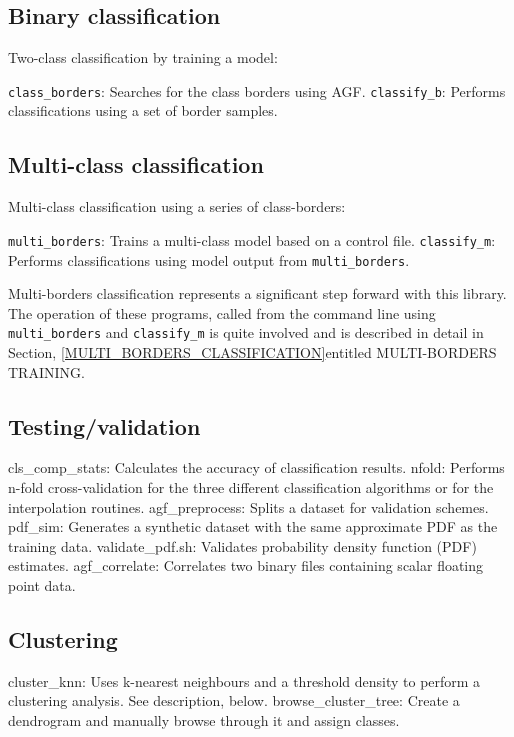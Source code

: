 \documentclass[12pt]{article}
\begin{document}
\subsection{Binary classification}

Two-class classification by training a model:

  \verb/class_borders/:	Searches for the class borders using AGF.
  \verb/classify_b/:		Performs classifications using a set of border samples.

\subsection{Multi-class classification}

Multi-class classification using a series of class-borders:

  \verb/multi_borders/:	Trains a multi-class model based on a control file.
  \verb/classify_m/:		Performs classifications using model output from \verb/multi_borders/.

  Multi-borders classification represents a significant step forward with this library.  The operation of these programs, called from the command line using \verb/multi_borders/ and \verb/classify_m/ is quite involved and is described in detail in Section, \ref{MULTI_BORDERS_CLASSIFICATION}entitled MULTI-BORDERS TRAINING.

\subsection{Testing/validation}

  cls_comp_stats:	Calculates the accuracy of classification results.
  nfold:		Performs n-fold cross-validation for the three different classification algorithms or for the interpolation routines.
  agf_preprocess:	Splits a dataset for validation schemes.
  pdf_sim:		Generates a synthetic dataset with the same approximate PDF as the training data.
  validate_pdf.sh:	Validates probability density function (PDF) estimates.
  agf_correlate:	Correlates two binary files containing scalar floating point data.

\subsection{Clustering}

  cluster_knn:	Uses k-nearest neighbours and a threshold density to perform
		  a clustering analysis.  See description, below.
  browse_cluster_tree:	Create a dendrogram and manually browse through it and assign classes.
\end{document}
